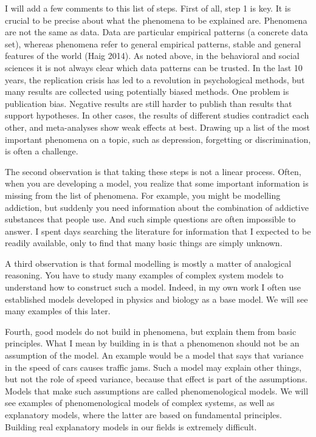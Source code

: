 \documentclass[
  a4paper,
  DIV=11,
  numbers=noendperiod,
  oneside]{scrreprt}
\begin{document}
I will add a few comments to this list of steps. First of all, step 1 is
key. It is crucial to be precise about what the phenomena to be
explained are. Phenomena are not the same as data. Data are particular
empirical patterns (a concrete data set), whereas phenomena refer to
general empirical patterns, stable and general features of the world
(Haig 2014). As noted above, in the behavioral and social sciences it is
not always clear which data patterns can be trusted. In the last 10
years, the replication crisis has led to a revolution in psychological
methods, but many results are collected using potentially biased
methods. One problem is publication bias. Negative results are still
harder to publish than results that support hypotheses. In other cases,
the results of different studies contradict each other, and
meta-analyses show weak effects at best. Drawing up a list of the most
important phenomena on a topic, such as depression, forgetting or
discrimination, is often a challenge.

The second observation is that taking these steps is not a linear
process. Often, when you are developing a model, you realize that some
important information is missing from the list of phenomena. For
example, you might be modelling addiction, but suddenly you need
information about the combination of addictive substances that people
use. And such simple questions are often impossible to answer. I spent
days searching the literature for information that I expected to be
readily available, only to find that many basic things are simply
unknown.

A third observation is that formal modelling is mostly a matter of
analogical reasoning. You have to study many examples of complex system
models to understand how to construct such a model. Indeed, in my own
work I often use established models developed in physics and biology as
a base model. We will see many examples of this later.

Fourth, good models do not build in phenomena, but explain them from
basic principles. What I mean by building in is that a phenomenon should
not be an assumption of the model. An example would be a model that says
that variance in the speed of cars causes traffic jams. Such a model may
explain other things, but not the role of speed variance, because that
effect is part of the assumptions. Models that make such assumptions are
called phenomenological models. We will see examples of phenomenological
models of complex systems, as well as explanatory models, where the
latter are based on fundamental principles. Building real explanatory
models in our fields is extremely difficult.
\end{document}
